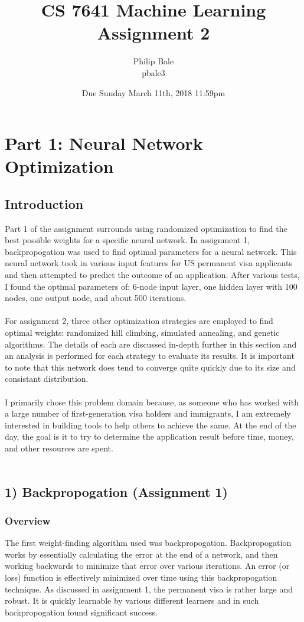 \documentclass[h]{article}
\title{CS 7641 Machine Learning \\ Assignment 2}
\date{Due Sunday March 11th, 2018 11:59pm}
\author{Philip Bale \\ pbale3}
\begin{document}
\maketitle

\section*{Part 1: Neural Network Optimization}
\subsection*{ Introduction}  
Part 1 of the assignment surrounds using randomized optimization to find the 
best possible weights for a specific neural network.  In assignment 1, backpropogation 
was used to find optimal parameters for a neural network.  This neural network 
took in various input features for US permanent visa applicants and then 
attempted to predict the outcome of an application.  After various tests, I found the optimal parameters of: 6-node input layer, one hidden layer with 100 nodes, 
one output node, and about 500 iterations.
\\ \\
For assignment 2, three other optimization strategies are employed to find 
optimal weights: randomized hill climbing, simulated annealing, and genetic 
algorithms.  The details of each are discussed in-depth further in this section 
and an analysis is performed for each strategy to evaluate its results.  It is 
important to note that this network does tend to converge quite quickly due to  
its size and consistant distribution.
\\ \\ 
I primarily chose this problem domain because, as someone who has worked 
with a large number of first-generation visa holders and immigrants, I am 
extremely interested in building tools to help others to achieve the same.  At the end of the day, the goal is it to try to determine the application result 
before time, money, and other resources are spent.
\\ \\

\subsection*{1) Backpropogation (Assignment 1)}  
\subsubsection*{Overview}
The first weight-finding algorithm used was backpropogation.  Backpropogation works by essentially calculating 
the error at the end of a network, and then working backwards to minimize that error over various iterations. 
 An error (or loss) function is effectively minimized over time using this backpropogation technique.   As discussed in assignment 1, the permanent 
 visa is rather large and robust.  It is quickly learnable by various different 
 learners and in such backpropogation found significant success.
 
\end{document}
